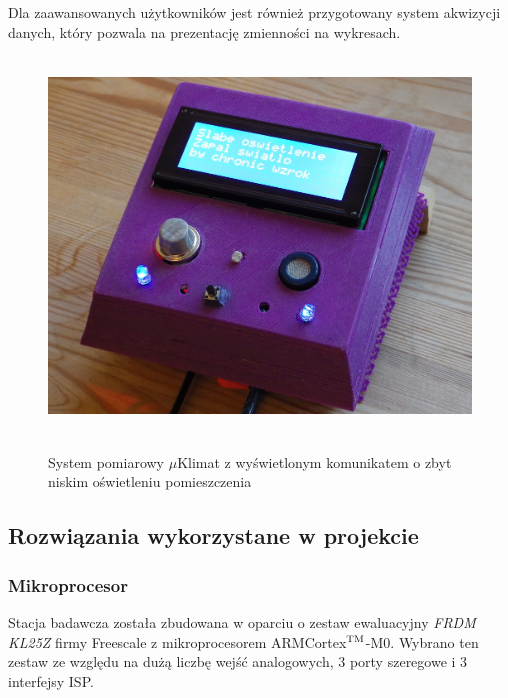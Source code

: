 \documentclass[12pt,a4paper]{article}
\begin{document}
Dla zaawansowanych użytkowników jest również przygotowany system akwizycji danych, który pozwala na prezentację zmienności na wykresach.

\begin{figure}[!h]
	\centering
	\includegraphics[height =100mm]{mikroklimat.jpg}
	\label{mikroklimat}
	\caption{System pomiarowy $\mu$Klimat z wyświetlonym komunikatem o zbyt niskim oświetleniu pomieszczenia}
\end{figure}

\subsection{Rozwiązania wykorzystane w projekcie}
\subsubsection{Mikroprocesor}
Stacja badawcza została zbudowana w oparciu o zestaw ewaluacyjny \textit{FRDM KL25Z} firmy Freescale z mikroprocesorem ARM\textregistered Cortex$^{\textsc{TM}}$-M0. Wybrano ten zestaw ze względu na dużą liczbę wejść analogowych, 3 porty szeregowe i 3 interfejsy ISP.
\end{document}
